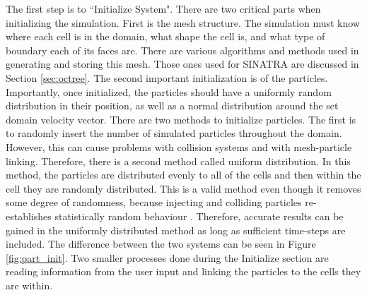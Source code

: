 The first step is to ``Initialize System". There are two critical parts when initializing the simulation. First is the mesh structure. The simulation must know where each cell is in the domain, what shape the cell is, and what type of boundary each of its faces are. There are various algorithms and methods used in generating and storing this mesh. Those ones used for SINATRA are discussed in Section \ref{sec:octree}. The second important initialization is of the particles. Importantly, once initialized, the particles should have a uniformly random distribution in their position, as well as a normal distribution around the set domain velocity vector. There are two methods to initialize particles. The first is to randomly insert the number of simulated particles throughout the domain. However, this can cause problems with collision systems and with mesh-particle linking. Therefore, there is a second method called uniform distribution. In this method, the particles are distributed evenly to all of the cells and then within the cell they are randomly distributed. This is a valid method even though it removes some degree of randomness, because injecting and colliding particles re-establishes statistically random behaviour \cite{bird_dsmc,Galvez2018a,mac_thesis}. Therefore, accurate results can be gained in the uniformly distributed method as long as sufficient time-steps are included. The difference between the two systems can be seen in Figure \ref{fig:part_init}. Two smaller processes done during the Initialize section are reading information from the user input and linking the particles to the cells they are within. \par

